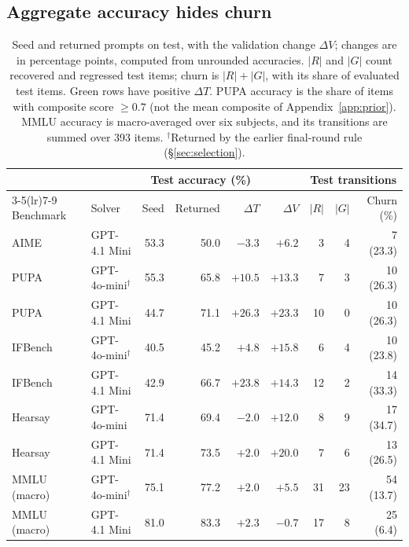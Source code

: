 \documentclass[11pt]{article}
\begin{document}
\subsection{Aggregate accuracy hides churn}
\label{sec:itemresults}

\begin{table}[!t]
\centering
\small
\setlength{\tabcolsep}{4pt}
\begin{tabular}{llrrrrrrr}
\toprule
\rowcolor{midblue}
 &  & \multicolumn{3}{c}{Test accuracy (\%)} & &
\multicolumn{3}{c}{Test transitions} \\
\cmidrule(lr){3-5}\cmidrule(lr){7-9}
\rowcolor{midblue}
Benchmark & Solver & Seed & Returned & $\Delta T$ & $\Delta V$ & $|R|$ & $|G|$ & Churn (\%) \\
\midrule
AIME & GPT-4.1 Mini & 53.3 & 50.0 & $-3.3$ & $+6.2$ & 3 & 4 & 7 (23.3) \\
\rowcolor{softgreen}
PUPA & GPT-4o-mini$^\dagger$ & 55.3 & 65.8 & $+10.5$ & $+13.3$ & 7 & 3 & 10 (26.3) \\
\rowcolor{softgreen}
PUPA & GPT-4.1 Mini & 44.7 & 71.1 & $+26.3$ & $+23.3$ & 10 & 0 & 10 (26.3) \\
\rowcolor{softgreen}
IFBench & GPT-4o-mini$^\dagger$ & 40.5 & 45.2 & $+4.8$ & $+15.8$ & 6 & 4 & 10 (23.8) \\
\rowcolor{softgreen}
IFBench & GPT-4.1 Mini & 42.9 & 66.7 & $+23.8$ & $+14.3$ & 12 & 2 & 14 (33.3) \\
Hearsay & GPT-4o-mini & 71.4 & 69.4 & $-2.0$ & $+12.0$ & 8 & 9 & 17 (34.7) \\
\rowcolor{softgreen}
Hearsay & GPT-4.1 Mini & 71.4 & 73.5 & $+2.0$ & $+20.0$ & 7 & 6 & 13 (26.5) \\
\rowcolor{softgreen}
MMLU (macro) & GPT-4o-mini$^\dagger$ & 75.1 & 77.2 & $+2.0$ & $+5.5$ & 31 & 23 & 54 (13.7) \\
\rowcolor{softgreen}
MMLU (macro) & GPT-4.1 Mini & 81.0 & 83.3 & $+2.3$ & $-0.7$ & 17 & 8 & 25 (6.4) \\
\bottomrule
\end{tabular}
\caption{Seed and returned prompts on test, with the validation change $\Delta V$; changes are in percentage points, computed from unrounded accuracies. $|R|$ and $|G|$ count recovered and regressed test items; churn is $|R|+|G|$, with its share of evaluated test items. Green rows have positive $\Delta T$. PUPA accuracy is the share of items with composite score $\geq 0.7$ (not the mean composite of Appendix~\ref{app:prior}). MMLU accuracy is macro-averaged over six subjects, and its transitions are summed over 393 items. $^\dagger$Returned by the earlier final-round rule (\S\ref{sec:selection}).}
\label{tab:main}
\end{table}
\end{document}

